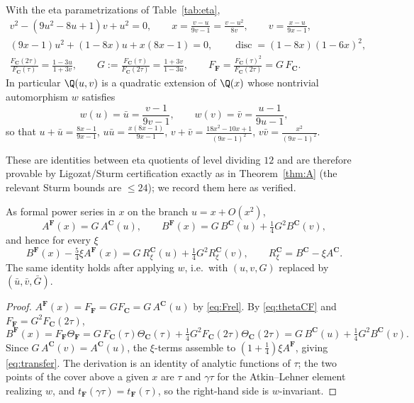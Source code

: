 \begin{proposition}\label{prop:cover}
 With the eta parametrizations of
Table~\ref{tab:eta},
\begin{gather}
v^2-(9u^2-8u+1)v+u^2=0,\qquad x=\frac{v-u}{9v-1}=\frac{v-u^2}{8v},\qquad v=\frac{x-u}{9x-1},
\label{eq:modeq}\\
(9x-1)u^2+(1-8x)u+x(8x-1)=0,\qquad \operatorname{disc}=(1-8x)(1-6x)^2,
\label{eq:uquad}\\
\frac{F_{\mathbf C}(2\tau)}{F_{\mathbf C}(\tau)}=\frac{1-3u}{1+3v},
\qquad G:=\frac{F_{\mathbf C}(\tau)}{F_{\mathbf C}(2\tau)}=\frac{1+3v}{1-3u},
\qquad F_{\mathbf F}=\frac{F_{\mathbf C}(\tau)^2}{F_{\mathbf C}(2\tau)}=G\,F_{\mathbf C}.
\label{eq:Frel}
\end{gather}
In particular $\Q(u,v)$ is a quadratic extension of $\Q(x)$ whose nontrivial
automorphism $w$ satisfies
\begin{equation}\label{eq:winvol}
w(u)=\bar u=\frac{v-1}{9v-1},\qquad w(v)=\bar v=\frac{u-1}{9u-1},
\end{equation}
so that $u+\bar u=\frac{8x-1}{9x-1}$, $u\bar u=\frac{x(8x-1)}{9x-1}$,
$v+\bar v=\frac{18x^2-10x+1}{(9x-1)^2}$, $v\bar v=\frac{x^2}{(9x-1)^2}$.
\end{proposition}

These are identities between eta quotients of level dividing $12$ and are therefore
provable by Ligozat/Sturm certification exactly as in Theorem~\ref{thm:A} (the
relevant Sturm bounds are $\le24$); we record them here as verified.

\begin{proposition}\label{prop:transfer}
\Proved{} As formal power series in $x$ on the branch $u=x+O(x^2)$,
\[
A^{\mathbf F}(x)=G\,A^{\mathbf C}(u),\qquad
B^{\mathbf F}(x)=G\,B^{\mathbf C}(u)+\tfrac14G^2B^{\mathbf C}(v),
\]
and hence for every $\xi$
\begin{equation}\label{eq:transfer}
B^{\mathbf F}(x)-\tfrac54\xi A^{\mathbf F}(x)
=G\,R^{\mathbf C}_\xi(u)+\tfrac14G^2R^{\mathbf C}_\xi(v),
\qquad R^{\mathbf C}_\xi=B^{\mathbf C}-\xi A^{\mathbf C}.
\end{equation}
The same identity holds after applying $w$, i.e.\ with $(u,v,G)$ replaced by
$(\bar u,\bar v,\bar G)$.
\end{proposition}
\begin{proof}
$A^{\mathbf F}(x)=F_{\mathbf F}=GF_{\mathbf C}=G\,A^{\mathbf C}(u)$ by
\eqref{eq:Frel}.  By \eqref{eq:thetaCF} and $F_{\mathbf F}=G^2F_{\mathbf C}(2\tau)$,
\[
B^{\mathbf F}(x)=F_{\mathbf F}\Theta_{\mathbf F}
=G\,F_{\mathbf C}(\tau)\Theta_{\mathbf C}(\tau)
+\tfrac14G^2F_{\mathbf C}(2\tau)\Theta_{\mathbf C}(2\tau)
=G\,B^{\mathbf C}(u)+\tfrac14G^2B^{\mathbf C}(v).
\]
Since $G\,A^{\mathbf C}(v)=A^{\mathbf C}(u)$, the $\xi$-terms assemble to
$(1+\tfrac14)\xi A^{\mathbf F}$, giving \eqref{eq:transfer}.  The derivation is an
identity of analytic functions of $\tau$; the two points of the cover above a given
$x$ are $\tau$ and $\gamma\tau$ for the Atkin--Lehner element realizing $w$, and
$t_{\mathbf F}(\gamma\tau)=t_{\mathbf F}(\tau)$, so the right-hand side is
$w$-invariant.
\end{proof}

